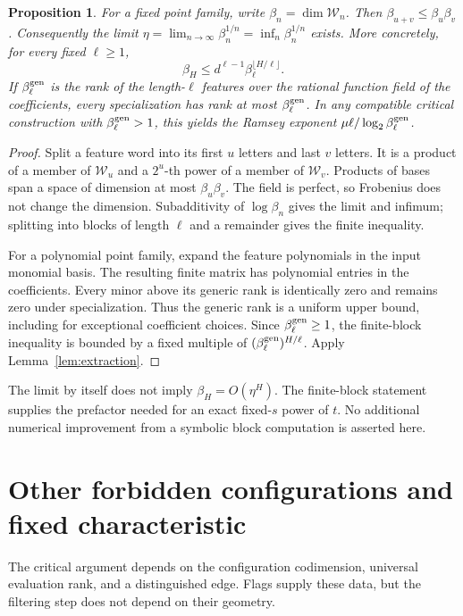 \documentclass[11pt,a4paper]{article}
\newcommand{\Wcal}{\mathcal W}
\newtheorem{proposition}[theorem]{Proposition}
\theoremstyle{definition}
\theoremstyle{remark}
\numberwithin{equation}{section}
\begin{document}
\begin{proposition}\label{prop:finite-block}
For a fixed point family, write $\beta_n=\dim\Wcal_n$. Then $\beta_{u+v}\le\beta_u\beta_v$. Consequently the limit $\eta=\lim_{n\to\infty}\beta_n^{1/n}=\inf_n\beta_n^{1/n}$ exists. More concretely, for every fixed $\ell\ge1$,
\[
\beta_H\le d^{\ell-1}\beta_\ell^{\lfloor H/\ell\rfloor}.
\]
If $\beta_\ell^{\rm gen}$ is the rank of the length-$\ell$ features over the rational function field of the coefficients, every specialization has rank at most $\beta_\ell^{\rm gen}$. In any compatible critical construction with $\beta_\ell^{\rm gen}>1$, this yields the Ramsey exponent $\mu\ell/\log_2\beta_\ell^{\rm gen}$.
\end{proposition}

\begin{proof}
Split a feature word into its first $u$ letters and last $v$ letters. It is a product of a member of $\Wcal_u$ and a $2^u$-th power of a member of $\Wcal_v$. Products of bases span a space of dimension at most $\beta_u\beta_v$. The field is perfect, so Frobenius does not change the dimension. Subadditivity of $\log\beta_n$ gives the limit and infimum; splitting into blocks of length $\ell$ and a remainder gives the finite inequality.

For a polynomial point family, expand the feature polynomials in the input monomial basis. The resulting finite matrix has polynomial entries in the coefficients. Every minor above its generic rank is identically zero and remains zero under specialization. Thus the generic rank is a uniform upper bound, including for exceptional coefficient choices. Since $\beta_\ell^{\rm gen}\ge1$, the finite-block inequality is bounded by a fixed multiple of $(\beta_\ell^{\rm gen})^{H/\ell}$. Apply Lemma~\ref{lem:extraction}.
\end{proof}

The limit by itself does not imply $\beta_H=O(\eta^H)$. The finite-block statement supplies the prefactor needed for an exact fixed-$s$ power of $t$. No additional numerical improvement from a symbolic block computation is asserted here.

\section{Other forbidden configurations and fixed characteristic}\label{sec:general}
The critical argument depends on the configuration codimension, universal evaluation rank, and a distinguished edge. Flags supply these data, but the filtering step does not depend on their geometry.
\end{document}
